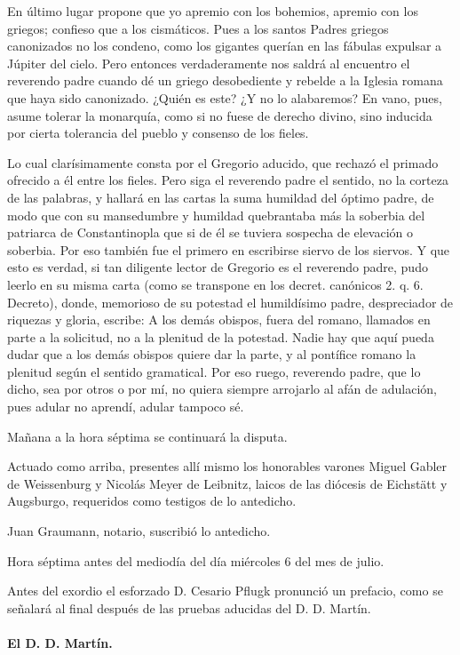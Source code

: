 En último lugar propone que yo apremio con los bohemios, apremio con los griegos; confieso que a los cismáticos. Pues a los santos Padres griegos canonizados no los condeno, como los gigantes querían en las fábulas expulsar a Júpiter del cielo. Pero entonces verdaderamente nos saldrá al encuentro el reverendo padre cuando dé un griego desobediente y rebelde a la Iglesia romana que haya sido canonizado. ¿Quién es este? ¿Y no lo alabaremos? En vano, pues, asume tolerar la monarquía, como si no fuese de derecho divino, sino inducida por cierta tolerancia del pueblo y consenso de los fieles.

Lo cual clarísimamente consta por el Gregorio aducido, que rechazó el primado ofrecido a él entre los fieles. Pero siga el reverendo padre el sentido, no la corteza de las palabras, y hallará en las cartas la suma humildad del óptimo padre, de modo que con su mansedumbre y humildad quebrantaba más la soberbia del patriarca de Constantinopla que si de él se tuviera sospecha de elevación o soberbia. Por eso también fue el primero en escribirse siervo de los siervos. Y que esto es verdad, si tan diligente lector de Gregorio es el reverendo padre, pudo leerlo en su misma carta (como se transpone en los decret. canónicos 2. q. 6. Decreto), donde, memorioso de su potestad el humildísimo padre, despreciador de riquezas y gloria, escribe: A los demás obispos, fuera del romano, llamados en parte a la solicitud, no a la plenitud de la potestad. Nadie hay que aquí pueda dudar que a los demás obispos quiere dar la parte, y al pontífice romano la plenitud \marginpar{\small[285]} según el sentido gramatical. Por eso ruego, reverendo padre, que lo dicho, sea por otros o por mí, no quiera siempre arrojarlo al afán de adulación, pues adular no aprendí, adular tampoco sé.

Mañana a la hora séptima se continuará la disputa.

Actuado como arriba, presentes allí mismo los honorables varones Miguel Gabler de Weissenburg y Nicolás Meyer de Leibnitz, laicos de las diócesis de Eichstätt y Augsburgo, requeridos como testigos de lo antedicho.

Juan Graumann, notario, suscribió lo antedicho.

Hora séptima antes del mediodía del día miércoles 6 del mes de julio.

Antes del exordio el esforzado D. Cesario Pflugk pronunció un prefacio, como se señalará al final después de las pruebas aducidas del D. D. Martín.

\paragraph*{El D. D. Martín.}

